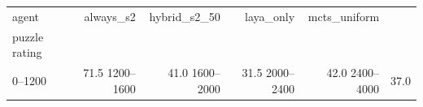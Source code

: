 \begin{tabular}{lrrrr}
agent & always_s2 & hybrid_s2_50 & laya_only & mcts_uniform \\
puzzle rating &  &  &  &  \\
0–1200 & 71.5%
1200–1600 & 41.0%
1600–2000 & 31.5%
2000–2400 & 42.0%
2400–4000 & 37.0%
\end{tabular}
